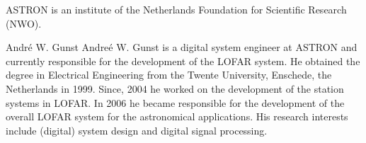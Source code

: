 \documentclass[journal]{IEEEtran}
\begin{document}
ASTRON is an institute of the Netherlands Foundation for Scientific Research (NWO).

\ifCLASSOPTIONcaptionsoff
  \newpage
\fi





%
%
%
%
%



% 

\begin{IEEEbiography}{Andr\'{e} W. Gunst}
Andre\'{e} W. Gunst is a digital system engineer at ASTRON and currently responsible for the development of the LOFAR system. He obtained the degree in Electrical Engineering from the Twente University, Enschede, the Netherlands in 1999. Since, 2004 he worked on the development of the station systems in LOFAR. In 2006 he became responsible for the development of the overall LOFAR system for the astronomical applications. His research interests include (digital) system design and digital signal processing.
\end{IEEEbiography}
\end{document}
